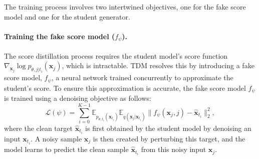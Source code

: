 \documentclass[letterpaper]{article} %
\begin{document}
The training process involves two intertwined objectives, one for the fake score model and one for the student generator.

\paragraph{Training the fake score model ($f_{\psi}$).}
The score distillation process requires the student model's score function $\nabla_{\mathbf{x}_j} \log p_{\theta, j|t_i}(\mathbf{x}_{j})$, which is intractable. TDM resolves this by introducing a fake score model, $f_{\psi}$, a neural network trained concurrently to approximate the student's score. To ensure this approximation is accurate, 
the fake score model $f_{\psi}$ is trained using a denoising objective as follows:
\begin{equation}
\label{eq:fake_score_loss}
\mathcal{L}(\psi) = \sum_{i=0}^{K-1} \mathbb{E}_{p_{\theta,t_i}(\mathbf{x}_{t_i})} \mathbb{E}_{q(\mathbf{x}_j|\hat{\mathbf{x}}_{t_i})} \| f_{\psi}(\mathbf{x}_j, j) - \hat{\mathbf{x}}_{t_i} \|^2_2,
\end{equation}
where the clean target $\hat{\mathbf{x}}_{t_i}$ is first obtained by the student model by denoising an input $\mathbf{x}_{t_i}$. A noisy sample $\mathbf{x}_{j}$ is then created by perturbing this target, and the model learns to predict the clean sample $\hat{\mathbf{x}}_{t_i}$ from this noisy input $\mathbf{x}_{j}$.
\end{document}
